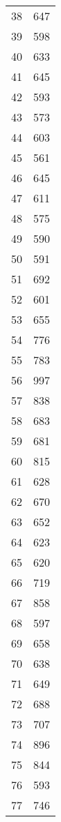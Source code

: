 \begin{table}[!h]
\begin{tabular}{|c|c|}
		\num{38} & \num{647}\\
		\num{39} & \num{598}\\
		\num{40} & \num{633}\\
		\num{41} & \num{645}\\
		\num{42} & \num{593}\\
		\num{43} & \num{573}\\
		\num{44} & \num{603}\\
		\num{45} & \num{561}\\
		\num{46} & \num{645}\\
		\num{47} & \num{611}\\
		\num{48} & \num{575}\\
		\num{49} & \num{590}\\
		\num{50} & \num{591}\\
		\num{51} & \num{692}\\
		\num{52} & \num{601}\\
		\num{53} & \num{655}\\
		\num{54} & \num{776}\\
		\num{55} & \num{783}\\
		\num{56} & \num{997}\\
		\num{57} & \num{838}\\
		\num{58} & \num{683}\\
		\num{59} & \num{681}\\
		\num{60} & \num{815}\\
		\num{61} & \num{628}\\
		\num{62} & \num{670}\\
		\num{63} & \num{652}\\
		\num{64} & \num{623}\\
		\num{65} & \num{620}\\
		\num{66} & \num{719}\\
		\num{67} & \num{858}\\
		\num{68} & \num{597}\\
		\num{69} & \num{658}\\
		\num{70} & \num{638}\\
		\num{71} & \num{649}\\
		\num{72} & \num{688}\\
		\num{73} & \num{707}\\
		\num{74} & \num{896}\\
		\num{75} & \num{844}\\
		\num{76} & \num{593}\\
		\num{77} & \num{746}\\

\end{tabular}
\end{table}
